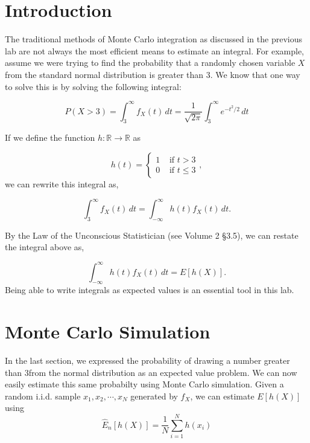 \label{lab:montecarlo2}

\section*{Introduction}

The traditional methods of Monte Carlo integration as discussed in the previous lab are not always the most efficient means to estimate an integral. For example, assume we were trying to find the probability that a randomly chosen variable $X$ from the standard normal distribution is greater than $3$. We know that one way to solve this is by solving the following integral:

\begin{equation} \label{eq:integral} 
P(X > 3) = \int_{3}^{\infty} f_X(t)\,dt = \frac{1}{\sqrt{2\pi}}\int_{3}^{\infty} e^{-t^2/2}\,dt
\end{equation}

If we define the function $h: \mathbb{R} \rightarrow \mathbb{R}$ as 

$$h(t) = \begin{cases}
1 & \text{ if } t > 3 \\ 
0 & \text{ if } t \leq 3 
\end{cases}, $$
we can rewrite this integral as,

\begin{equation*}
\int_{3}^{\infty} f_X(t)\,dt = \int_{-\infty}^{\infty} h(t)f_X(t)\,dt.
\end{equation*}

By the Law of the Unconscious Statistician (see Volume 2 \S 3.5), we can restate the integral above as,

$$\int_{-\infty}^{\infty} h(t)f_X(t)\,dt = E[h(X)].$$
Being able to write integrals as expected values is an essential tool in this lab.

\section*{Monte Carlo Simulation}
In the last section, we expressed the probability of drawing a number greater than $3$from the normal distribution as an expected value problem. We can now easily estimate this same probabilty using Monte Carlo simulation. 
Given a random i.i.d. sample $x_1, x_2, \cdots , x_N$ generated by $f_X$, we can estimate $E[h(X)]$ using
\begin{equation} \label{eq:estimator}
\widehat{E}_n[h(X)] = \frac{1}{N}\sum_{i = 1}^{N}h(x_i)
\end{equation}

